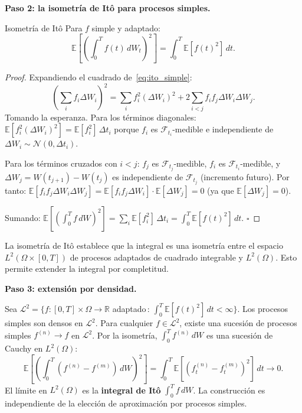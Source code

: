 \medskip
\noindent\textbf{Paso 2: la isometría de Itô para procesos simples.}

\begin{teorema}{Isometría de Itô}
\label{thm:isometria}
Para $f$ simple y adaptado:
\begin{equation}
  \mathbb{E}\!\left[\left(\int_0^T f(t)\,dW_t\right)^2\right]
  = \int_0^T \mathbb{E}[f(t)^2]\,dt.
  \label{eq:isometria}
\end{equation}
\end{teorema}

\begin{proof}
Expandiendo el cuadrado de~\eqref{eq:ito_simple}:
\[
  \left(\sum_i f_i\Delta W_i\right)^2
  = \sum_i f_i^2 (\Delta W_i)^2
  + 2\sum_{i < j} f_i f_j \Delta W_i \Delta W_j.
\]
Tomando la esperanza. Para los términos diagonales: $\mathbb{E}[f_i^2(\Delta W_i)^2]
= \mathbb{E}[f_i^2]\,\Delta t_i$ porque $f_i$ es $\mathcal{F}_{t_i}$-medible
e independiente de $\Delta W_i \sim \mathcal{N}(0,\Delta t_i)$.

Para los términos cruzados con $i < j$: $f_j$ es $\mathcal{F}_{t_j}$-medible,
$f_i$ es $\mathcal{F}_{t_i}$-medible, y $\Delta W_j = W(t_{j+1})-W(t_j)$ es
independiente de $\mathcal{F}_{t_j}$ (incremento futuro). Por tanto:
$\mathbb{E}[f_i f_j \Delta W_i \Delta W_j] = \mathbb{E}[f_i f_j \Delta W_i]
\cdot \mathbb{E}[\Delta W_j] = 0$ (ya que $\mathbb{E}[\Delta W_j] = 0$).

Sumando: $\mathbb{E}[(\int_0^T f\,dW)^2] = \sum_i \mathbb{E}[f_i^2]\,\Delta t_i
= \int_0^T \mathbb{E}[f(t)^2]\,dt$. $\square$
\end{proof}

La isometría de Itô establece que la integral es una isometría entre el espacio
$L^2(\Omega \times [0,T])$ de procesos adaptados de cuadrado integrable y
$L^2(\Omega)$. Esto permite extender la integral por completitud.

\medskip
\noindent\textbf{Paso 3: extensión por densidad.}

Sea $\mathcal{L}^2 = \{f: [0,T]\times\Omega \to \mathbb{R}$ adaptado$\,:\,
\int_0^T \mathbb{E}[f(t)^2]\,dt < \infty\}$.
Los procesos simples son densos en $\mathcal{L}^2$. Para cualquier $f \in
\mathcal{L}^2$, existe una sucesión de procesos simples $f^{(n)} \to f$ en
$\mathcal{L}^2$. Por la isometría, $\int_0^T f^{(n)}\,dW$ es una sucesión de
Cauchy en $L^2(\Omega)$:
\[
  \mathbb{E}\!\left[\left(\int_0^T (f^{(n)}-f^{(m)})\,dW\right)^2\right]
  = \int_0^T \mathbb{E}[(f^{(n)}_t-f^{(m)}_t)^2]\,dt \to 0.
\]
El límite en $L^2(\Omega)$ es la \textbf{integral de Itô} $\int_0^T f\,dW$.
La construcción es independiente de la elección de aproximación por procesos
simples.

